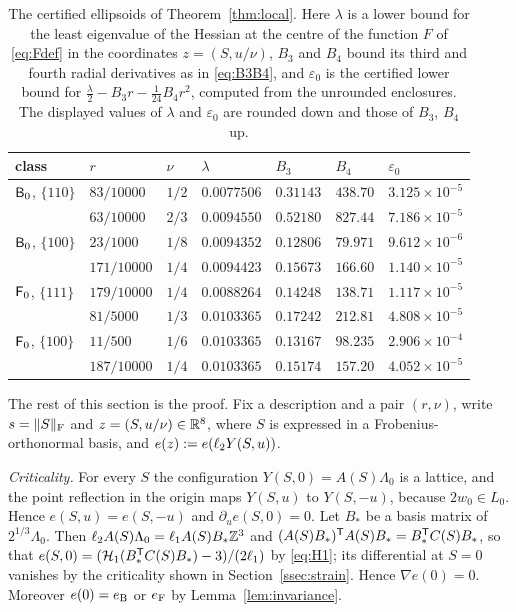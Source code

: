 \begin{table}[h]
\begin{tabular}{lllllll}
\toprule
class & $r$ & $\nu$ & $\lambda$ & $B_3$ & $B_4$ & $\varepsilon_0$\\
\midrule
$\mathsf B_0$, $\{110\}$ & $83/10000$ & $1/2$ & $0.0077506$ & $0.31143$ & $438.70$ & $3.125\times10^{-5}$\\
                 & $63/10000$ & $2/3$ & $0.0094550$ & $0.52180$ & $827.44$ & $7.186\times10^{-5}$\\
$\mathsf B_0$, $\{100\}$ & $23/1000$ & $1/8$ & $0.0094352$ & $0.12806$ & $79.971$ & $9.612\times10^{-6}$\\
                 & $171/10000$ & $1/4$ & $0.0094423$ & $0.15673$ & $166.60$ & $1.140\times10^{-5}$\\
$\mathsf F_0$, $\{111\}$ & $179/10000$ & $1/4$ & $0.0088264$ & $0.14248$ & $138.71$ & $1.117\times10^{-5}$\\
                 & $81/5000$ & $1/3$ & $0.0103365$ & $0.17242$ & $212.81$ & $4.808\times10^{-5}$\\
$\mathsf F_0$, $\{100\}$ & $11/500$ & $1/6$ & $0.0103365$ & $0.13167$ & $98.235$ & $2.906\times10^{-4}$\\
                 & $187/10000$ & $1/4$ & $0.0103365$ & $0.15174$ & $157.20$ & $4.052\times10^{-5}$\\
\bottomrule
\end{tabular}
\caption{The certified ellipsoids of Theorem~\ref{thm:local}. Here $\lambda$ is a lower bound for the least eigenvalue of the Hessian
at the centre of the function $F$ of \eqref{eq:Fdef} in the coordinates $z=(S,u/\nu)$, $B_3$ and $B_4$ bound its third and fourth
radial derivatives as in \eqref{eq:B3B4}, and $\varepsilon_0$ is the certified lower bound for
$\frac\lambda2-B_3r-\frac1{24}B_4r^2$, computed from the unrounded enclosures. The displayed values of $\lambda$ and $\varepsilon_0$ are
rounded down and those of $B_3$, $B_4$ up.}\label{tab:atlas}
\end{table}

The rest of this section is the proof. Fix a description and a pair $(r,\nu)$, write $s=\|S\|_\mathrm F$ and $z=(S,u/\nu)\in\mathbb R^8$, where
$S$ is expressed in a Frobenius-orthonormal basis, and $e(z):=e(\ell_2 Y(S,u))$.

\emph{Criticality.} For every $S$ the configuration $Y(S,0)=A(S)\Lambda_0$ is a lattice, and the point reflection in the origin maps
$Y(S,u)$ to $Y(S,-u)$, because $2w_0\in L_0$. Hence $e(S,u)=e(S,-u)$ and $\partial_ue(S,0)=0$. Let $B_\ast$ be a basis matrix of
$2^{1/3}\Lambda_0$. Then $\ell_2 A(S)\Lambda_0=\ell_1 A(S)B_\ast\mathbb Z^3$ and $(A(S)B_\ast)^\mathsf T A(S)B_\ast=B_\ast^\mathsf T C(S)B_\ast$, so that
$e(S,0)=(\mathcal H_1(B_\ast^\mathsf T C(S)B_\ast)-3)/(2\ell_1)$ by \eqref{eq:H1}; its differential at $S=0$ vanishes by the criticality shown in
Section~\ref{ssec:strain}. Hence $\nabla e(0)=0$. Moreover $e(0)=e_{\mathrm B}$ or $e_{\mathrm F}$ by Lemma~\ref{lem:invariance}.

